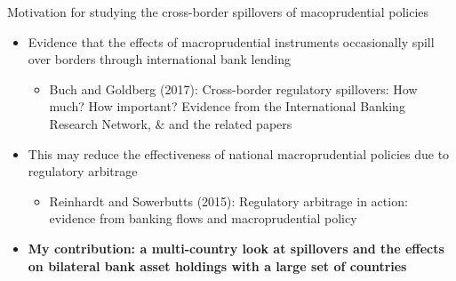 \documentclass{beamer}
\begin{document}

\begin{frame}{Motivation for studying the cross-border spillovers of macoprudential policies}
\begin{itemize}
\item Evidence that the effects of macroprudential instruments occasionally spill over borders through international bank lending
\begin{itemize}
\item Buch and Goldberg (2017): Cross-border regulatory spillovers: How much? How important? Evidence from the International Banking Research Network, \& and the related papers
\end{itemize}
\item This may reduce the effectiveness of national macroprudential policies due to regulatory arbitrage
\begin{itemize}
\item Reinhardt and Sowerbutts (2015): Regulatory arbitrage in action: evidence from banking flows and macroprudential policy 
\end{itemize}
\item \textbf{My contribution: a multi-country look at spillovers and the effects on bilateral bank asset holdings with a large set of countries}
\end{itemize}
\end{frame}
\end{document}
